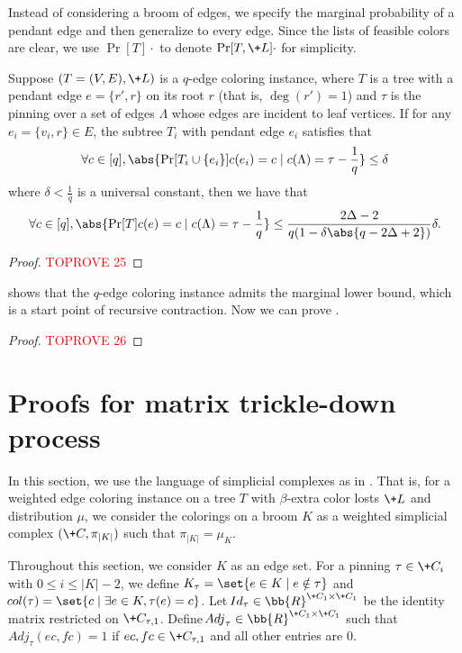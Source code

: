 \documentclass[a4paper,11pt]{article}
\begin{document}
Instead of considering a broom of edges, we specify the marginal probability of a pendant edge and then generalize to every edge.
Since the lists of feasible colors are clear, we use $\Pr[T]{\cdot}$ to denote $\Pr[T,\+L]{\cdot}$ for simplicity.
\begin{lemma}\label{lem:WSM_contraction}
Suppose $(T = (V,E), \+L)$ is a $q$-edge coloring instance, where $T$ is a tree with a pendant edge $e = \{r',r\}$ on its root $r$ (that is, $\deg(r')=1$) and $\tau$ is the pinning over a set of edges $\Lambda$ whose edges are incident to leaf vertices.  
If for any $e_i = \{v_i,r\}\in E$, the subtree $T_i$ with pendant edge $e_i$ satisfies that 
$$
    \forall c\in[q], \abs{\Pr[T_i\cup \{e_i\}]{c(e_i) = c\mid c(\Lambda) = \tau} - \frac 1q} \leq \delta
$$
where $\delta < \frac 1q$ is a universal constant, then we have that
$$
    \forall c\in [q], \abs{\Pr[T]{c(e) = c\mid c(\Lambda) = \tau} - \frac 1q} \leq \frac{2\Delta - 2}{q(1 - \delta\abs{q-2\Delta + 2})} \delta.
$$
\end{lemma}
\begin{proof}\textcolor{red}{TOPROVE 25}\end{proof}
 shows that the $q$-edge coloring instance admits the marginal lower bound, which is a start point of recursive contraction.
Now we can prove .
\begin{proof}\textcolor{red}{TOPROVE 26}\end{proof}

 



\appendix

\section{Proofs for matrix trickle-down process}
\label{appendix-mtd}
In this section, we use the language of simplicial complexes as in .
That is, for a weighted edge coloring instance on a tree $T$ with $\beta$-extra
color losts $\+L$ and distribution $\mu$, we consider the colorings on a broom $K$ 
as a weighted simplicial complex $(\+C, \pi_{|K|})$ such that $\pi_{|K|} = \mu_K$.

Throughout this section, we consider $K$ as an edge set.
For a pinning $\tau\in \+C_{i}$ with $0\le i\le|K|-2$, we define
$K_\tau = \set{e\in K\mid e\notin \tau}$ and $\!{col}(\tau)=\set{c \mid \exists e\in K, \tau(e)=c}$. Let $\!{Id}_\tau \in \bb{R}^{\+C_1\times \+C_1}$ be the identity matrix restricted on $\+C_{\tau,1}$. Define 
$\!{Adj}_\tau \in \bb{R}^{\+C_1\times \+C_1}$ such that $\!{Adj}_\tau(ec,fc)=1$ if $ec,fc\in \+C_{\tau,1}$ and all other entries are $0$.
\end{document}
